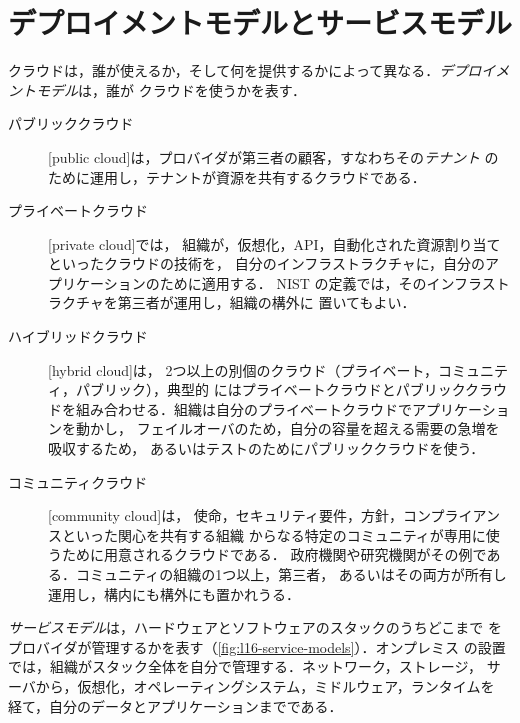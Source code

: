 \documentclass[../main.tex]{subfiles}
\begin{document}
\section{デプロイメントモデルとサービスモデル}
\label{sec:l16-models}

クラウドは，誰が使えるか，そして何を提供するかによって異なる．\emph{デプロイメントモデル}は，誰が
クラウドを使うかを表す．
\begin{description}
  \item[パブリッククラウド] %
    [public cloud]は，プロバイダが第三者の顧客，すなわちその\emph{テナント}
    のために運用し，テナントが資源を共有するクラウドである．
  \item[プライベートクラウド]
    [private cloud]では，
    組織が，仮想化，API，自動化された資源割り当てといったクラウドの技術を，
    自分のインフラストラクチャに，自分のアプリケーションのために適用する．
    NIST の定義では，そのインフラストラクチャを第三者が運用し，組織の構外に
    置いてもよい．
  \item[ハイブリッドクラウド]
    [hybrid cloud]は，
    2つ以上の別個のクラウド（プライベート，コミュニティ，パブリック），典型的
    にはプライベートクラウドとパブリッククラウドを組み合わせる．組織は自分のプライベートクラウドでアプリケーションを動かし，
    フェイルオーバのため，自分の容量を超える需要の急増を吸収するため，
    あるいはテストのためにパブリッククラウドを使う．
  \item[コミュニティクラウド]
    [community cloud]は，
    使命，セキュリティ要件，方針，コンプライアンスといった関心を共有する組織
    からなる特定のコミュニティが専用に使うために用意されるクラウドである．
    政府機関や研究機関がその例である．コミュニティの組織の1つ以上，第三者，
    あるいはその両方が所有し運用し，構内にも構外にも置かれうる．
\end{description}

\emph{サービスモデル}は，ハードウェアとソフトウェアのスタックのうちどこまで
をプロバイダが管理するかを表す（\cref{fig:l16-service-models}）．オンプレミス
の設置では，組織がスタック全体を自分で管理する．ネットワーク，ストレージ，
サーバから，仮想化，オペレーティングシステム，ミドルウェア，ランタイムを
経て，自分のデータとアプリケーションまでである．
\end{document}
